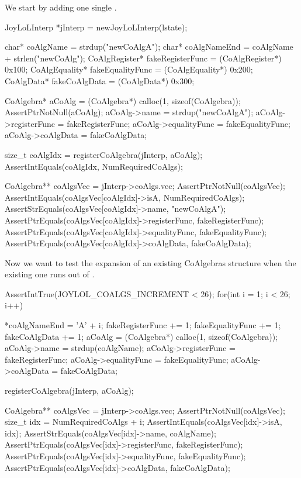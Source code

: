 
We start by adding one single . 

\startCTest
  JoyLoLInterp *jInterp = newJoyLoLInterp(lstate);

  char*          coAlgName        = strdup("newCoAlgA");
  char*          coAlgNameEnd     = coAlgName + strlen("newCoAlg");
  CoAlgRegister* fakeRegisterFunc = (CoAlgRegister*) 0x100;
  CoAlgEquality* fakeEqualityFunc = (CoAlgEquality*) 0x200;
  CoAlgData*     fakeCoAlgData    = (CoAlgData*)     0x300;
  
  CoAlgebra* aCoAlg    = (CoAlgebra*) calloc(1, sizeof(CoAlgebra));
  AssertPtrNotNull(aCoAlg);
  aCoAlg->name         = strdup("newCoAlgA");
  aCoAlg->registerFunc = fakeRegisterFunc;
  aCoAlg->equalityFunc = fakeEqualityFunc;
  aCoAlg->coAlgData    = fakeCoAlgData;
  
  size_t coAlgIdx = registerCoAlgebra(jInterp, aCoAlg);
  AssertIntEquals(coAlgIdx, NumRequiredCoAlgs);
  
  CoAlgebra** coAlgsVec = jInterp->coAlgs.vec;
  AssertPtrNotNull(coAlgsVec);
  AssertIntEquals(coAlgsVec[coAlgIdx]->isA, NumRequiredCoAlgs);
  AssertStrEquals(coAlgsVec[coAlgIdx]->name, "newCoAlgA");
  AssertPtrEquals(coAlgsVec[coAlgIdx]->registerFunc, fakeRegisterFunc);
  AssertPtrEquals(coAlgsVec[coAlgIdx]->equalityFunc, fakeEqualityFunc);
  AssertPtrEquals(coAlgsVec[coAlgIdx]->coAlgData,    fakeCoAlgData);
\stopCTest

Now we want to test the expansion of an existing CoAlgebras structure when 
the existing one runs out of . 

\startCTest
  AssertIntTrue(JOYLOL_COALGS_INCREMENT < 26);
  for(int i = 1; i < 26; i++) {
    *coAlgNameEnd        = 'A' + i;
    fakeRegisterFunc    += 1;
    fakeEqualityFunc    += 1;
    fakeCoAlgData       += 1;
    aCoAlg               = (CoAlgebra*) calloc(1, sizeof(CoAlgebra));
    aCoAlg->name         = strdup(coAlgName);
    aCoAlg->registerFunc = fakeRegisterFunc;
    aCoAlg->equalityFunc = fakeEqualityFunc;
    aCoAlg->coAlgData    = fakeCoAlgData;
    
    registerCoAlgebra(jInterp, aCoAlg);

    CoAlgebra** coAlgsVec = jInterp->coAlgs.vec;
    AssertPtrNotNull(coAlgsVec);
    size_t idx = NumRequiredCoAlgs + i;
    AssertIntEquals(coAlgsVec[idx]->isA, idx);
    AssertStrEquals(coAlgsVec[idx]->name, coAlgName);
    AssertPtrEquals(coAlgsVec[idx]->registerFunc, fakeRegisterFunc);
    AssertPtrEquals(coAlgsVec[idx]->equalityFunc, fakeEqualityFunc);
    AssertPtrEquals(coAlgsVec[idx]->coAlgData,    fakeCoAlgData);
  }
\stopCTest

